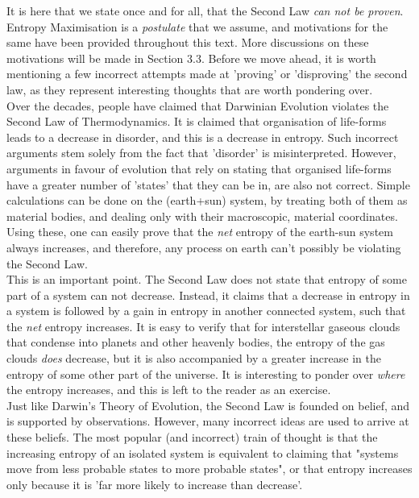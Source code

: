 \documentclass[oneside]{book}
\begin{document}
It is here that we state once and for all, that the Second Law \emph{can not be proven}. Entropy Maximisation is a \emph{postulate} that we assume, and motivations for the same have been provided throughout this text. More discussions on these motivations will be made in Section 3.3. Before we move ahead, it is worth mentioning a few incorrect attempts made at 'proving' or 'disproving' the second law, as they represent interesting thoughts that are worth pondering over.\\

Over the decades, people have claimed that Darwinian Evolution violates the Second Law of Thermodynamics. It is claimed that organisation of life-forms leads to a decrease in disorder, and this is a decrease in entropy. Such incorrect arguments stem solely from the fact that 'disorder' is misinterpreted. However, arguments in favour of evolution that rely on stating that organised life-forms have a greater number of 'states' that they can be in, are also not correct. Simple calculations can be done on the (earth+sun) system, by treating both of them as material bodies, and dealing only with their macroscopic, material coordinates. Using these, one can easily prove that the \emph{net} entropy of the earth-sun system always increases, and therefore, any process on earth can't possibly be violating the Second Law.\\

This is an important point. The Second Law does not state that entropy of some part of a system can not decrease. Instead, it claims that a decrease in entropy in a system is followed by a gain in entropy in another connected system, such that the \emph{net} entropy increases. It is easy to verify that for interstellar gaseous clouds that condense into planets and other heavenly bodies, the entropy of the gas clouds \emph{does} decrease, but it is also accompanied by a greater increase in the entropy of some other part of the universe. It is interesting to ponder over \emph{where} the entropy increases, and this is left to the reader as an exercise.\\

Just like Darwin's Theory of Evolution, the Second Law is founded on belief, and is supported by observations. However, many incorrect ideas are used to arrive at these beliefs. The most popular (and incorrect) train of thought is that the increasing entropy of an isolated system is equivalent to claiming that "systems move from less probable states to more probable states", or that entropy increases only because it is 'far more likely to increase than decrease'. \\
\end{document}
